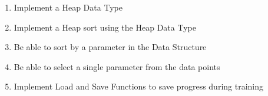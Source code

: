 \begin{flushleft}
\begin{enumerate}
\begin{enumerate}
\begin{enumerate}
                        \item Implement a Heap Data Type
                        \item Implement a Heap sort using the Heap Data Type
                        \item Be able to sort by a parameter in the Data Structure
                        \item Be able to select a single parameter from the data points
                        \item Implement Load and Save Functions to save progress during training
                    \end{enumerate}   
            \end{enumerate}
    \end{enumerate}
\end{flushleft}